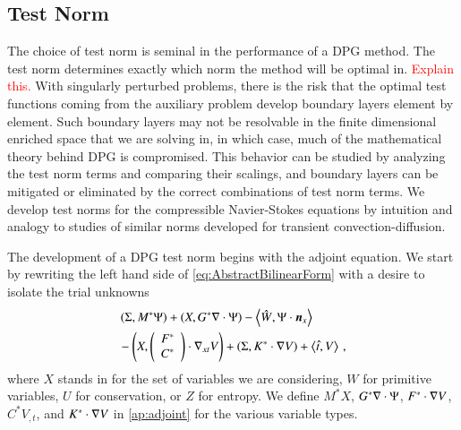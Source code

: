 \documentclass[preprint,12pt]{elsarticle}
\begin{document}
\subsection{Test Norm}
The choice of test norm is seminal in the performance of a DPG method.
The test norm determines exactly which norm the method will be optimal in. \textcolor{red}{Explain this.}
With singularly perturbed problems, there is the risk that the optimal test functions coming from the auxiliary problem develop boundary layers
element by element. 
Such boundary layers may not be resolvable in the finite dimensional enriched space that we are solving in, in which case,
much of the mathematical theory behind DPG is compromised.
This behavior can be studied by analyzing the test norm terms and comparing their scalings, and boundary layers
can be mitigated or eliminated by the correct combinations of test norm terms.
We develop test norms for the compressible Navier-Stokes equations by intuition and analogy to studies of similar norms
developed for transient convection-diffusion.

The development of a DPG test norm begins with the adjoint equation.
We start by rewriting the left hand side of \eqref{eq:AbstractBilinearForm} with a desire to isolate the trial unknowns
\begin{align*}
&\left( \Sigma,M^*\Psi \right)
+\left( X,G^*\nabla\cdot\Psi \right)
-\left\langle \hat W,\Psi\cdot\boldsymbol n_x \right\rangle\\
&-\left( X,\left( \begin{array}{c} F^*\\ C^*\\ \end{array} \right)\cdot\nabla_{xt} V \right)
+\left( \Sigma,K^*\cdot\nabla V \right)
+\left\langle \hat t,V \right\rangle\,,
\end{align*}
where $X$ stands in for the set of variables we are considering, $W$ for primitive variables, $U$ for conservation, or $Z$ for entropy.
We define $M^*X$, $G^*\nabla\cdot\Psi$, $F^*\cdot\nabla V$, $C^*V_{,t}$, and $K^*\cdot\nabla V$ in \ref{ap:adjoint} for the various variable types.
\end{document}
